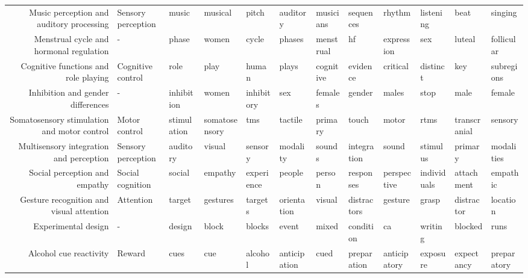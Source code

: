 \documentclass[english]{article}
\begin{document}
\begin{landscape}
\begin{center}
\begin{supertabular}{rlllllllllll}
Music perception and auditory processing &  Sensory perception &            music &       musical &           pitch &       auditory &   musicians &      sequences &        rhythm &      listening &          beat &        singing \\
Menstrual cycle and hormonal regulation &                   - &            phase &         women &           cycle &         phases &   menstrual &             hf &    expression &            sex &        luteal &     follicular \\
Cognitive functions and role playing &   Cognitive control &             role &          play &           human &          plays &   cognitive &       evidence &      critical &       distinct &           key &     subregions \\
   Inhibition and gender differences &                   - &       inhibition &         women &      inhibitory &            sex &     females &         gender &         males &           stop &          male &         female \\
Somatosensory stimulation and motor control &       Motor control &      stimulation & somatosensory &             tms &        tactile &     primary &          touch &         motor &           rtms &  transcranial &        sensory \\
Multisensory integration and perception &  Sensory perception &         auditory &        visual &         sensory &       modality &      sounds &    integration &         sound &       stimulus &       primary &     modalities \\
       Social perception and empathy &    Social cognition &           social &       empathy &      experience &         people &      person &      responses &   perspective &    individuals &    attachment &       empathic \\
Gesture recognition and visual attention &           Attention &           target &      gestures &         targets &    orientation &      visual &    distractors &       gesture &          grasp &    distractor &       location \\
                 Experimental design &                   - &           design &         block &          blocks &          event &       mixed &      condition &            ca &        writing &       blocked &           runs \\
              Alcohol cue reactivity &              Reward &             cues &           cue &         alcohol &   anticipation &        cued &    preparation &  anticipatory &       exposure &    expectancy &    preparatory \\

\end{supertabular}
\end{center}
\end{landscape}
\end{document}
